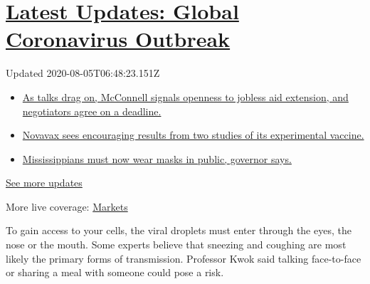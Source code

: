 \hypertarget{latest-updates-global-coronavirus-outbreak}{%
\section{\texorpdfstring{\href{https://www.nytimes.com/2020/08/04/world/coronavirus-cases.html?action=click\&pgtype=Article\&state=default\&region=MAIN_CONTENT_1\&context=storylines_live_updates}{Latest
Updates: Global Coronavirus
Outbreak}}{Latest Updates: Global Coronavirus Outbreak}}\label{latest-updates-global-coronavirus-outbreak}}

Updated 2020-08-05T06:48:23.151Z

\begin{itemize}
\tightlist
\item
  \href{https://www.nytimes.com/2020/08/04/world/coronavirus-cases.html?action=click\&pgtype=Article\&state=default\&region=MAIN_CONTENT_1\&context=storylines_live_updates\#link-762df92}{As
  talks drag on, McConnell signals openness to jobless aid extension,
  and negotiators agree on a deadline.}
\item
  \href{https://www.nytimes.com/2020/08/04/world/coronavirus-cases.html?action=click\&pgtype=Article\&state=default\&region=MAIN_CONTENT_1\&context=storylines_live_updates\#link-1228a480}{Novavax
  sees encouraging results from two studies of its experimental
  vaccine.}
\item
  \href{https://www.nytimes.com/2020/08/04/world/coronavirus-cases.html?action=click\&pgtype=Article\&state=default\&region=MAIN_CONTENT_1\&context=storylines_live_updates\#link-794484ed}{Mississippians
  must now wear masks in public, governor says.}
\end{itemize}

\href{https://www.nytimes.com/2020/08/04/world/coronavirus-cases.html?action=click\&pgtype=Article\&state=default\&region=MAIN_CONTENT_1\&context=storylines_live_updates}{See
more updates}

More live coverage:
\href{https://www.nytimes.com/live/2020/08/04/business/stock-market-today-coronavirus?action=click\&pgtype=Article\&state=default\&region=MAIN_CONTENT_1\&context=storylines_live_updates}{Markets}

To gain access to your cells, the viral droplets must enter through the
eyes, the nose or the mouth. Some experts believe that sneezing and
coughing are most likely the primary forms of transmission. Professor
Kwok said talking face-to-face or sharing a meal with someone could pose
a risk.

